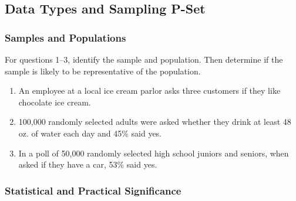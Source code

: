 \documentclass{article}
\newcounter{pset}
\begin{document}
\subsection*{Data Types and Sampling P-Set}

\subsubsection*{Samples and Populations}

For questions 1--3, identify the sample and population. Then determine if the sample is likely to be representative of the population.
\begin{enumerate}
    \item An employee at a local ice cream parlor asks three customers if they like chocolate ice cream.
    \item 100,000 randomly selected adults were asked whether they drink at least 48 oz. of water each day and 45\% said yes.
    \item In a poll of 50,000 randomly selected high school juniors and seniors, when asked if they have a car, 53\% said yes.
\end{enumerate} \setcounter{pset}{\value{enumi}}

\subsubsection*{Statistical and Practical Significance}
\end{document}
